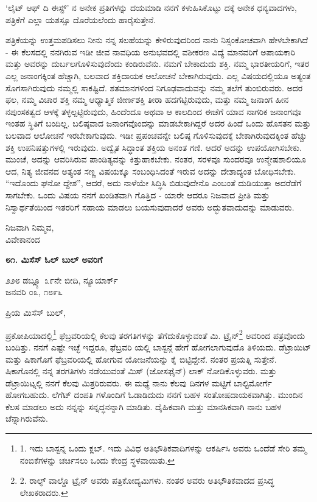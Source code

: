 ‘ಲೈಟ್ ಆಫ್ ದಿ ಈಸ್ಟ್’ ನ ಅನೇಕ ಪ್ರತಿಗಳನ್ನು ದಯಮಾಡಿ ನನಗೆ ಕಳುಹಿಸಿಕೊಟ್ಟು ದಕ್ಕೆ ಅನೇಕ ಧನ್ಯವಾದಗಳು, ಪತ್ರಿಕೆಗೆ ಎಲ್ಲಾ ಯಶಸ್ಸೂ ದೊರೆಯಲೆಂದು ಹಾರೈಸುತ್ತೇನೆ.

ಪತ್ರಿಕೆಯನ್ನು ಉತ್ತಮಪಡಿಸಲು ನೀನು ನನ್ನ ಸಲಹೆಯನ್ನು ಕೇಳಿರುವುದರಿಂದ ನಾನು ನಿಸ್ಸಂಕೋಚವಾಗಿ ಹೇಳಬೇಕಾಗಿದೆ - ಈ ಕೆಲಸದಲ್ಲಿ ನನಗಿರುವ ಇಡೀ ಜೀವ ನಾವಧಿಯ ಅನುಭವದಲ್ಲಿ ವಶೀಕರಣ ವಿದ್ಯೆ ಮಾನವರಿಗೆ ಅಪಾಯಕಾರಿ ಮತ್ತು ಅವರನ್ನು ದುರ್ಬಲಗೊಳಿಸುವುದೆಂದು ಕಂಡಿರುವೆನು. ನಮಗೆ ಬೇಕಾದುದು ಶಕ್ತಿ. ನಮ್ಮ ಭಾರತೀಯರಿಗೆ, ಇತರ ಎಲ್ಲ ಜನಾಂಗಕ್ಕಿಂತ ಹೆಚ್ಚಾಗಿ, ಬಲವಾದ ಶಕ್ತಿದಾಯಕ ಆಲೋಚನೆ ಬೇಕಾಗಿರುವುದು. ಎಲ್ಲ ವಿಷಯದಲ್ಲಿಯೂ ಅತ್ಯಂತ ಸೊಗಸಾಗಿರುವುದು ನಮ್ಮಲ್ಲಿ ಸಾಕಷ್ಟಿದೆ. ಶತಮಾನಗಳಿಂದ ನಿಗೂಢವಾದುವನ್ನು ನಮ್ಮ ತಲೆಗೆ ತುಂಬಿರುವರು. ಅದರ ಫಲ, ನಮ್ಮ ವಿಚಾರ ಶಕ್ತಿ ನಮ್ಮ ಆಧ್ಯಾತ್ಮಿಕ ಜೀರ್ಣಶಕ್ತಿ ತೀರಾ ಹದಗೆಟ್ಟಿರುವುದು, ಮತ್ತು ನಮ್ಮ ಜನಾಂಗ ಹೀನ ನಪುಂಸಕತ್ವದ ಆಳಕ್ಕೆ ತಳ್ಳಲ್ಪಟ್ಟಿರುವುದು, ಹಿಂದೆಂದೂ ಅಥವಾ ಆ ಕಾಲದಿಂದ ಈಚೆಗೆ ಯಾವ ನಾಗರಿಕ ಜನಾಂಗವೂ ಇಂತಹ ಸ್ಥಿತಿಗೆ ಬಂದಿಲ್ಲ. ಬಲಿಷ್ಠವಾದ ಜನಾಂಗವೊಂದನ್ನು ಮಾಡಬೇಕಾಗಿದ್ದರೆ ಅದರ ಹಿಂದೆ ಒಂದು ಹೊಸತನ ಮತ್ತು ಬಲವಾದ ಆಲೋಚನೆ ಇರಬೇಕಾಗುವುದು. ಇಡೀ ಪ್ರಪಂಚವನ್ನೇ ಬಲಿಷ್ಠ ಗೊಳಿಸುವುದಕ್ಕೆ ಬೇಕಾಗಿರುವುದಕ್ಕಿಂತ ಹೆಚ್ಚು ಶಕ್ತಿ ಉಪನಿಷತ್ತುಗಳಲ್ಲಿ ಇರುವುದು. ಅದ್ವೈತ ಸಿದ್ಧಾಂತ ಶಕ್ತಿಯ ಅನಂತ ಗಣಿ. ಆದರೆ ಅದನ್ನು ಉಪಯೋಗಿಸಬೇಕು. ಮುಂಚೆ, ಅದನ್ನು ಆವರಿಸಿರುವ ಪಾಂಡಿತ್ಯವನ್ನು ಕಿತ್ತುಹಾಕಬೇಕು. ನಂತರ, ಸರಳವೂ ಸುಂದರವೂ ಉನ್ಮೇಷಶಾಲಿಯೂ ಆದ, ನಿತ್ಯ ಜೀವನದ ಅತ್ಯಂತ ಸಣ್ಣ ವಿಷಯಕ್ಕೂ ಸಂಬಂಧಿಸಿದಂತೆ ಇರುವ ಅದನ್ನು ದೇಶಾದ್ಯಂತ ಬೋಧಿಸಬೇಕು. “ಇದೊಂದು ಘನೋ ದ್ದೇಶ”, ಆದರೆ, ಅದು ನಾಳೆಯೇ ಸಿದ್ಧಿಸಿ ಬಿಡುವುದೇನೊ ಎಂಬಂತೆ ದುಡಿಯುತ್ತಾ ಅದರೆಡೆಗೆ ಸಾಗಬೇಕು. ಒಂದು ವಿಷಯ ನನಗೆ ಖಂಡಿತವಾಗಿ ಗೊತ್ತಿದ - ಯಾರೇ ಆದರೂ ನಿಜವಾದ ಪ್ರೀತಿ ಮತ್ತು ನಿಸ್ವಾರ್ಥತೆಯಿಂದ ಇತರರಿಗೆ ಸಹಾಯ ಮಾಡಲು ಬಯಸುವುದಾದರೆ ಅವರು ಅದ್ಭುತವಾದುದನ್ನು ಮಾಡುವರು.

\begin{flushright}
ನಿಜವಾಗಿ ನಿಮ್ಮವ,\\ವಿವೇಕಾನಂದ
\end{flushright}

\begin{center}
\textbf{೮೧. ಮಿಸೆಸ್ ಓಲ್ ಬುಲ್ ಅವರಿಗೆ}
\end{center}

\begin{flushright}
೨೨೮ ಡಬ್ಲ್ಯೂ ೩೯ನೇ ಬೀದಿ, ನ್ಯೂಯಾರ್ಕ್\\ಜನವರಿ ೦೩, ೧೮೯೬
\end{flushright}

ಪ್ರಿಯ ಮಿಸೆಸ್ ಬುಲ್,

ಪ್ರಕೋಪಿಯಾದಲ್ಲಿ\footnote{1. ಇದು ಬಾಸ್ಟನ್ನ ಒಂದು ಕ್ಲಬ್. ಇದು ವಿವಿಧ ಅತಿಭೌತಿಕವಾದಿಗಳನ್ನು ಆಕರ್ಷಿಸಿ ಅವರು ಒಂದೆಡೆ ಸೇರಿ ತಮ್ಮ ನಂಬಿಕೆಗಳನ್ನು ಚರ್ಚಿಸಲು ಒಂದು ಕೇಂದ್ರ ಸ್ಥಳವಾಯಿತು.} ಫೆಬ್ರವರಿಯಲ್ಲಿ ಕೆಲವು ತರಗತಿಗಳನ್ನು ತೆಗೆದುಕೊಳ್ಳುವಂತೆ ಮಿ. ಟ್ರೈನ್\footnote{2. ರಾಲ್ಫ್ ವಾಲ್ಡೊ ಟ್ರೈನ್ ಅವರು ಪತ್ರಿಕೋದ್ಯಮಿಗಳು. ನಂತರ ಅವರು ಅತಿಭೌತಿಕವಾದದ ಪ್ರಸಿದ್ಧ ಲೇಖಕರಾದರು.} ಅವರಿಂದ ಪತ್ರವೊಂದು ಬಂದಿತ್ತು. ನನಗೆ ಎಷ್ಟೇ ಇಚ್ಛೆ ಇದ್ದರೂ, ಫೆಬ್ರವರಿ ಯಲ್ಲಿ ಬಾಸ್ಟನ್ಗೆ ಹೇಗೆ ಹೋಗಲಾಗುವುದೊ ತಿಳಿಯದು. ಡೆಟ್ರಾಯಿಟ್ ಮತ್ತು ಷಿಕಾಗೊಗೆ ಫೆಬ್ರವರಿಯಲ್ಲಿ ಹೋಗುವ ಯೋಜನೆಯನ್ನು ಕೈ ಬಿಟ್ಟಿದ್ದೇನೆ. ನಂತರ ಪ್ರಯತ್ನಿ ಸುತ್ತೇನೆ. ಷಿಕಾಗೊನಲ್ಲಿ ನನ್ನ ತರಗತಿಗಳು ನಡೆಯುವಂತೆ ಮಿಸ್ (ಜೋಸಫೈನ್) ಲಾಕ್ ನೋಡಿಕೊಳ್ಳುವರು. ಮತ್ತು ಡೆಟ್ರಾಯಿಟ್ನಲ್ಲಿ ನನಗೆ ಕೆಲವು ಮಿತ್ರರಿರುವರು. ಈ ಮಧ್ಯೆ ನಾನು ಕೆಲವು ದಿನಗಳ ಮಟ್ಟಿಗೆ ಬಾಲ್ಟಿಮೋರ್ಗೆ ಹೋಗಬಹುದು. ಲೆಗೆಟ್ ದಂಪತಿ ಗಳೊಂದಿಗೆ ಓಡಾಡಿದುದು ನನಗೆ ಬಹಳ ಸಂತೋಷದಾಯಕವಾಗಿತ್ತು. ಮುಂದಿನ ಕೆಲಸ ಮಾಡಲು ಅದು ನನ್ನನ್ನು ಸನ್ನದ್ಧನನ್ನಾಗಿ ಮಾಡಿತು. ದೈಹಿಕವಾಗಿ ಮತ್ತು ಮಾನಸಿಕವಾಗಿ ನಾನು ಬಹಳ ಚೆನ್ನಾಗಿರುವೆನು.

